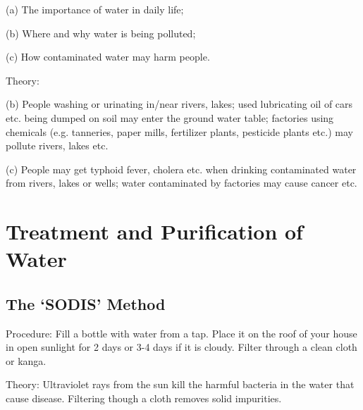\begin{multicols}{2}
\begin{description*}
{(a) The importance of water in daily life;

(b) Where and why water is being polluted;

(c) How contaminated water may harm people.}
\item[Theory:]{(b) People washing or urinating in/near
rivers, lakes; used lubricating oil of cars etc.
being dumped on soil may enter the ground
water table; factories using chemicals (e.g.
tanneries, paper mills, fertilizer plants, pesticide
plants etc.) may pollute rivers, lakes etc.

(c) People may get typhoid fever, cholera etc.
when drinking contaminated water from rivers,
lakes or wells; water contaminated by factories
may cause cancer etc.}
\end{description*}


\section*{Treatment and Purification of Water} 


\subsection{The `SODIS' Method}  %


\begin{description*}
\item[Procedure:]{Fill a bottle with water from a tap. Place it on the roof of your house in open sunlight for 2 days or 3-4 days if it is cloudy. Filter through a clean cloth or kanga.}
\item[Theory:]{Ultraviolet rays from the sun kill the harmful bacteria in the water that cause disease. Filtering though a cloth removes solid impurities.}
\end{description*}


\end{multicols}
